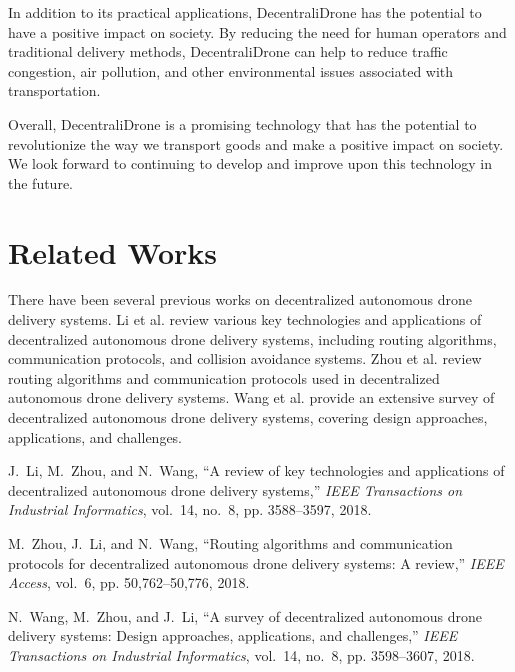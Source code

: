 \documentclass[conference]{IEEEtran}
\begin{document}
In addition to its practical applications, DecentraliDrone has the potential to have a positive impact on society. By reducing the need for human operators and traditional delivery methods, DecentraliDrone can help to reduce traffic congestion, air pollution, and other environmental issues associated with transportation.

Overall, DecentraliDrone is a promising technology that has the potential to revolutionize the way we transport goods and make a positive impact on society. We look forward to continuing to develop and improve upon this technology in the future.

\section{Related Works}

There have been several previous works on decentralized autonomous drone delivery systems. Li et al. \cite{li2018review} review various key technologies and applications of decentralized autonomous drone delivery systems, including routing algorithms, communication protocols, and collision avoidance systems. Zhou et al. \cite{zhou2018routing} review routing algorithms and communication protocols used in decentralized autonomous drone delivery systems. Wang et al. \cite{wang2018survey} provide an extensive survey of decentralized autonomous drone delivery systems, covering design approaches, applications, and challenges.

\begin{thebibliography}{1}

J.~Li, M.~Zhou, and N.~Wang, ``A review of key technologies and applications of decentralized autonomous drone delivery systems,'' \emph{IEEE Transactions on Industrial Informatics}, vol.~14, no.~8, pp. 3588--3597, 2018.

M.~Zhou, J.~Li, and N.~Wang, ``Routing algorithms and communication protocols for decentralized autonomous drone delivery systems: A review,'' \emph{IEEE Access}, vol.~6, pp. 50,762--50,776, 2018.

N.~Wang, M.~Zhou, and J.~Li, ``A survey of decentralized autonomous drone delivery systems: Design approaches, applications, and challenges,'' \emph{IEEE Transactions on Industrial Informatics}, vol.~14, no.~8, pp. 3598--3607, 2018.

\end{thebibliography}
\end{document}
